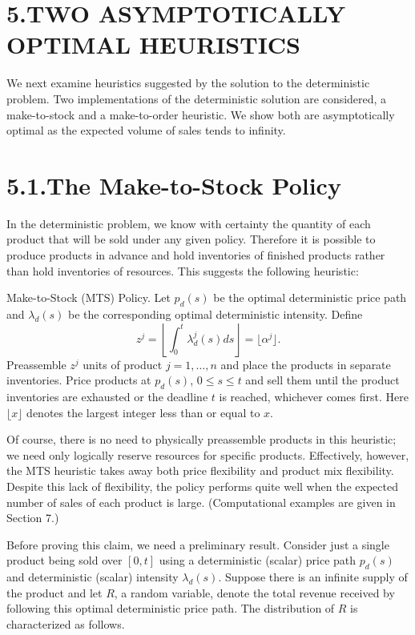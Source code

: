 \section{5.TWO ASYMPTOTICALLY OPTIMAL HEURISTICS}\label{two-asymptotically-optimal-heuristics}

We next examine heuristics suggested by the solution to the deterministic problem. Two implementations of the deterministic solution are considered, a make-to-stock and a make-to-order heuristic. We show both are asymptotically optimal as the expected volume of sales tends to infinity.

\section{5.1.The Make-to-Stock Policy}\label{the-make-to-stock-policy}

In the deterministic problem, we know with certainty the quantity of each product that will be sold under any given policy. Therefore it is possible to produce products in advance and hold inventories of finished products rather than hold inventories of resources. This suggests the following heuristic:

Make-to-Stock (MTS) Policy. Let \(p_d(s)\) be the optimal deterministic price path and \(\lambda_d(s)\) be the corresponding optimal deterministic intensity. Define
\[
z^j = \left\lfloor \int_{0}^{t} \lambda_d^j(s)  ds \right\rfloor = \lfloor \alpha^j \rfloor .
\]
Preassemble \(z^j\) units of product \(j = 1, \ldots, n\) and place the products in separate inventories. Price products at \(p_d(s)\), \(0 \leqslant s \leqslant t\) and sell them until the product inventories are exhausted or the deadline \(t\) is reached, whichever comes first. Here \(\lfloor x \rfloor\) denotes the largest integer less than or equal to \(x\).

Of course, there is no need to physically preassemble products in this heuristic; we need only logically reserve resources for specific products. Effectively, however, the MTS heuristic takes away both price flexibility and product mix flexibility. Despite this lack of flexibility, the policy performs quite well when the expected number of sales of each product is large. (Computational examples are given in Section 7.)

Before proving this claim, we need a preliminary result. Consider just a single product being sold over \([0, t]\) using a deterministic (scalar) price path \(p_d(s)\) and deterministic (scalar) intensity \(\lambda_d(s)\). Suppose there is an infinite supply of the product and let \(R\), a random variable, denote the total revenue received by following this optimal deterministic price path. The distribution of \(R\) is characterized as follows.

